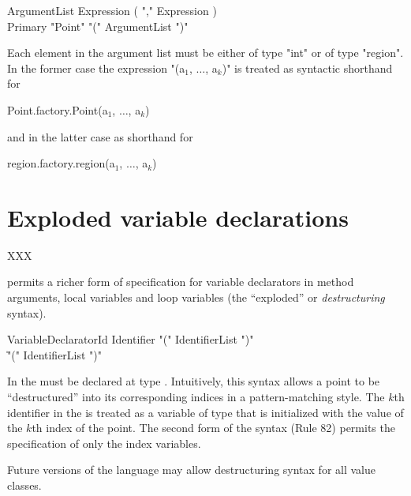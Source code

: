 \begin{grammar}
ArgumentList \: Expression ( \xcd"," Expression )\star \\
Primary \: \xcd"Point" \xcd"(" ArgumentList \xcd")"
\end{grammar}

Each element in the argument list must be either of type \xcd"int" or 
of type \xcd"region". In the former case the expression 
\xcdmath"(a$_1$, $\dots$, a$_k$)" is treated as syntactic shorthand for
\begin{xtenmath}
Point.factory.Point(a$_1$, $\dots$, a$_k$)
\end{xtenmath}
\noindent and in the latter case as shorthand for
\begin{xten}
region.factory.region(a$_1$, $\dots$, a$_k$)
\end{xten}

\section{Exploded variable declarations}\label{exploded-syntax}

XXX

\Xten{} permits a richer form of specification for variable
declarators in method arguments, local variables and loop variables
(the ``exploded'' or {\em destructuring} syntax).

\begin{grammar}
VariableDeclaratorId \:
           Identifier \xcd"(" IdentifierList \xcd")" \\
           \| \xcd"(" IdentifierList \xcd")" \\
\end{grammar}

In \XtenCurrVer{} the  must be declared at
type . Intuitively, this syntax allows a
point to be ``destructured'' into its corresponding  
indices in a pattern-matching style.
The $k$th identifier in the  is treated as a  variable of type 
that is initialized with the value of the $k$th index of the point. 
The second form of the syntax (Rule 82) permits the specification of only
the index variables.

Future versions of the language may allow destructuring syntax for all
value classes.

